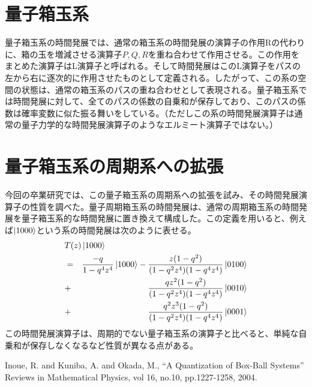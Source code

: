 \documentclass{jsreport}
\begin{document}
\section{量子箱玉系}
量子箱玉系の時間発展では、通常の箱玉系の時間発展の演算子の作用Rの代わりに、箱の玉を増減させる演算子$P,Q,R$を重ね合わせて作用させる。この作用をまとめた演算子はL演算子と呼ばれる。そして時間発展はこのL演算子をパスの左から右に逐次的に作用させたものとして定義される。したがって、この系の空間の状態は、通常の箱玉系のパスの重ね合わせとして表現される。量子箱玉系では時間発展に対して、全てのパスの係数の自乗和が保存しており、このパスの係数は確率変数に似た振る舞いをしている。（ただしこの系の時間発展演算子は通常の量子力学的な時間発展演算子のようなエルミート演算子ではない。）

\section{量子箱玉系の周期系への拡張}
今回の卒業研究では、この量子箱玉系の周期系への拡張を試み、その時間発展演算子の性質を調べた。量子周期箱玉系の時間発展は、通常の周期箱玉系の時間発展を量子箱玉系的な時間発展に置き換えて構成した。この定義を用いると、例えば$\ket{1000}$という系の時間発展は次のように表せる。
\begin{eqnarray*}
\lefteqn{ T(z)\ket{1000} }  \\
& = &\frac{-q}{1 - q^{4} z^{4}}\ket{1000} - \frac{z (1 - q^{2})}{(1-q^{2} z^{4})(1 - q^{4} z^{4})}\ket{0100} \\
& + & \frac{qz^2 (1 - q^{2})}{(1-q^{2} z^{4})(1 - q^{4} z^{4})}\ket{0010} \\
& + & \frac{q^2z^3 (1 - q^{2})}{(1-q^{2} z^{4})(1 - q^{4} z^{4})}\ket{0001} \\
\end{eqnarray*}
この時間発展演算子は、周期的でない量子箱玉系の演算子と比べると、単純な自乗和が保存しなくなるなど性質が異なる点がある。

\begin{thebibliography}{1}
  \bibitem{} Inoue, R. and Kuniba, A. and Okada, M.,
    ``A Quantization of Box-Ball Systems'' Reviews in Mathematical Physics,
    vol 16, no.10, pp.1227-1258, 2004.
\end{thebibliography}
\end{document}
